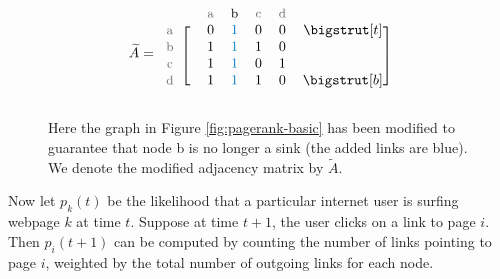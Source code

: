 \begin{figure}[H]
\captionsetup[subfigure]{justification=centering}
\centering
\begin{subfigure}{.45\textwidth}
\centering
{}
\end{subfigure}
%
\begin{subfigure}{.45\textwidth}
\centering
\begin{align*}
\widetilde{A} = \begin{blockarray}{ccccccc}
& & \small\text{\textcolor{gray}{a}} & \small\text{b} & \small\text{\textcolor{gray}{c}} & \small\text{\textcolor{gray}{d}} & \\
\begin{block}{c[cccccc]}
\small\text{\textcolor{gray}{a}} & & 0 & \textcolor{blue}{1} & 0 & 0 & \topstrut\\
\small\text{\textcolor{gray}{b}} & & 1 & \textcolor{blue}{1} & 1 & 0 & \\
\small\text{\textcolor{gray}{c}} & & 1 & \textcolor{blue}{1} & 0 & 1 & \\
\small\text{\textcolor{gray}{d}} & & 1 & \textcolor{blue}{1} & 1 & 0 & \botstrut\\
\end{block}\end{blockarray}
\end{align*}
\end{subfigure}
\caption{Here the graph in Figure \ref{fig:pagerank-basic} has been modified to guarantee that node b is no longer a sink (the added links are blue).
We denote the modified adjacency matrix by $\widetilde{A}$.}
\label{fig:pagerank-nosinks}
\end{figure}

Now let $p_k(t)$ be the likelihood that a particular internet user is surfing webpage $k$ at time $t$.
Suppose at time $t+1$, the user clicks on a link to page $i$.
Then $p_i(t+1)$ can be computed by counting the number of links pointing to page $i$, weighted by the total number of outgoing links for each node.

